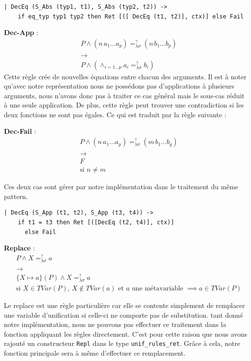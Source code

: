 \begin{lstlisting}[frame=single]
| DecEq (S_Abs (typ1, t1), S_Abs (typ2, t2)) -> 
    if eq_typ typ1 typ2 then Ret [([ DecEq (t1, t2)], ctx)] else Fail
\end{lstlisting}

\textbf{Dec-App} :
\begin{align*}
    &P \wedge (n \, a_1 \dots a_p) =_{\lambda \sigma}^{?} (n \, b_1 \dots b_p) \\
    &\xrightarrow{} \\
    &P \wedge (\wedge_{i=1 \dots p} a_i =_{\lambda \sigma}^{?} b_i)
\end{align*}
Cette règle crée de nouvelles équations entre chacun des arguments. Il est à noter qu'avec notre représentation nous ne possédons pas d'applications à plusieurs arguments, nous n'avons donc pas à traiter ce cas général mais le sous-cas réduit à une seule application.
De plus, cette règle peut trouver une contradiction si les deux fonctions ne sont pas égales. Ce qui est traduit par la règle suivante :

\textbf{Dec-Fail} :
\begin{align*}
    &P \wedge (n \, a_1 \dots a_p) =_{\lambda \sigma}^{?} (m \, b_1 \dots b_q) \\
    &\xrightarrow{} \\
    &F \\
    &\text{si $n \neq m$}
\end{align*}

Ces deux cas sont gérer par notre implémentation dans le traitement du même pattern.
\begin{lstlisting}[frame=single]
  | DecEq (S_App (t1, t2), S_App (t3, t4)) ->
    if t1 = t3 then Ret [([DecEq (t2, t4)], ctx)]
      else Fail
\end{lstlisting}

\textbf{Replace} :
\begin{align*}
    &P \wedge X =_{\lambda \sigma}^{?} a \\
    &\xrightarrow{} \\
    &\{ X \mapsto a \} (P) \wedge X =_{\lambda \sigma}^{?} a \\
    &\text{si $X \in TVar(P)$, $X \notin TVar(a)$ et $a$ une métavariable $\implies a \in TVar(P)$}
\end{align*}

Le replace est une règle particulière car elle se contente simplement de remplacer une variable d'unification si celle-ci ne comporte pas de substitution. \E{}tant donné notre implémentation, nous ne pouvons pas effectuer ce traitement dans la fonction appliquant les règles directement. C'est pour cette raison que nous avons rajouté un constructeur \verb|Repl| dans le type \verb|unif_rules_ret|.
Grâce à cela, notre fonction principale sera à même d'effectuer ce remplacement. 

